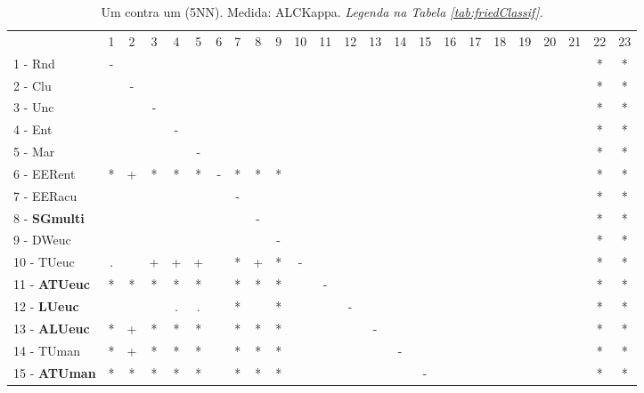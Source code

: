 \begin{table}[h]
\caption{Um contra um (5NN). Medida: ALCKappa. \textit{Legenda na Tabela \ref{tab:friedClassif}.}}
\begin{center}\begin{tabular}{lcc|cc|cc|cc|cc|cc|cc|cc|cc|cc|cc|c}
 			& 1 & 2 & 3 & 4 & 5 & 6 & 7 & 8 & 9 & 10 & 11 & 12 & 13 & 14 & 15 & 16 & 17 & 18 & 19 & 20 & 21 & 22 & 23\\
1 - Rnd  	& - &   &   &   &   &   &   &   &   &   &   &   &   &   &   &   &   &   &   &   &   & * & * \\
2 - Clu  	&   & - &   &   &   &   &   &   &   &   &   &   &   &   &   &   &   &   &   &   &   & * & * \\ \hline
3 - Unc  	&   &   & - &   &   &   &   &   &   &   &   &   &   &   &   &   &   &   &   &   &   & * & * \\
4 - Ent  	&   &   &   & - &   &   &   &   &   &   &   &   &   &   &   &   &   &   &   &   &   & * & * \\ \hline
5 - Mar  	&   &   &   &   & - &   &   &   &   &   &   &   &   &   &   &   &   &   &   &   &   & * & * \\
6 - EERent	& * & + & * & * & * & - & * & * & * &   &   &   &   &   &   &   &   &   &   &   &   & * & * \\ \hline
7 - EERacu	&   &   &   &   &   &   & - &   &   &   &   &   &   &   &   &   &   &   &   &   &   & * & * \\
8 - \textbf{SGmulti}	&   &   &   &   &   &   &   & - &   &   &   &   &   &   &   &   &   &   &   &   &   & * & * \\ \hline
9 - DWeuc	&   &   &   &   &   &   &   &   & - &   &   &   &   &   &   &   &   &   &   &   &   & * & * \\
10 - TUeuc	& . &   & + & + & + &   & * & + & * & - &   &   &   &   &   &   &   &   &   &   &   & * & * \\ \hline
11 - \textbf{ATUeuc}	& * & * & * & * & * &   & * & * & * &   & - &   &   &   &   &   &   &   &   &   &   & * & * \\
12 - \textbf{LUeuc}	&   &   &   & . & . &   & * &   & * &   &   & - &   &   &   &   &   &   &   &   &   & * & * \\ \hline
13 - \textbf{ALUeuc}	& * & + & * & * & * &   & * & * & * &   &   &   & - &   &   &   &   &   &   &   &   & * & * \\
14 - TUman	& * & + & * & * & * &   & * & * & * &   &   &   &   & - &   &   &   &   &   &   &   & * & * \\ \hline
15 - \textbf{ATUman}	& * & * & * & * & * &   & * & * & * &   &   &   &   &   & - &   &   &   &   &   &   & * & * \\

\end{tabular}
\end{center}
\end{table}
